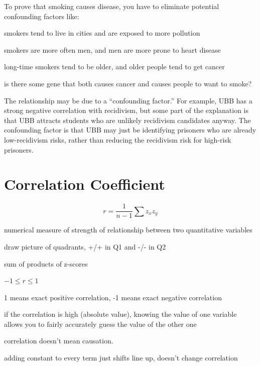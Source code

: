 \documentclass{exam}
\begin{document}
  To prove that smoking causes disease, you have to eliminate potential confounding
  factors like:
  \begin{itemize*}
    \item smokers tend to live in cities and are exposed to more pollution
    \item smokers are more often men, and men are more prone to heart disease
    \item long-time smokers tend to be older, and older people tend to get cancer
    \item is there some gene that both causes cancer and causes people to want to
      smoke?
  \end{itemize*}

  The relationship may be due to a ``confounding factor.''  For example, UBB has a
  strong negative correlation with recidivism, but some part of the explanation is
  that UBB attracts students who are unlikely recidivism candidates anyway.   The
  confounding factor is that UBB may just be identifying prisoners who are already
  low-recidivism risks, rather than reducing the recidivism risk for high-risk
  prisoners.

  \section{Correlation Coefficient}
  \[
    r = \frac{1}{n - 1} \sum z_x z_y
  \]

  \begin{itemize*}
    \item numerical measure of strength of relationship between two quantitative
      variables

    \item draw picture of quadrants, +/+ in Q1 and -/- in Q2

    \item sum of products of z-scores

    \item $-1 \leq r \leq 1$

    \item 1 means exact positive correlation, -1 means exact negative correlation

    \item if the correlation is high (absolute value), knowing the value of one
      variable allows you to fairly accurately guess the value of the other one

    \item correlation doesn't mean causation.  

    \item adding constant to every term just shifts line up, doesn't change
      correlation

  \end{itemize*}
\end{document}
